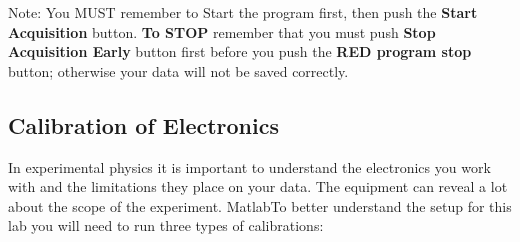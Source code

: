 \documentclass{../lab}
\begin{document}
Note: You MUST remember to Start the program first, then push the \textbf{Start Acquisition} button. \textbf{To STOP} remember that you must push \textbf{Stop Acquisition Early} button first before you push the \textbf{RED program stop} button; otherwise your data will not be saved correctly.

\subsection{Calibration of Electronics}

In experimental physics it is important to understand the electronics you work with and the limitations they place on your data. The equipment can reveal a lot about the scope of the experiment. MatlabTo better understand the setup for this lab you will need to run three types of calibrations:
\end{document}
